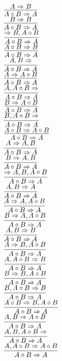 \documentclass[11pt]{article}
\begin{document}
\begin{center}
\bigskip
\\$\infer{A\circ B\Rightarrow A}{A\Rightarrow B}$
\bigskip
\\$\infer{A\circ B\Rightarrow A}{B\Rightarrow B}$
\bigskip
\\$\infer{A\circ B\Rightarrow A}{\Rightarrow B, A\circ B}$
\bigskip
\\$\infer{A\circ B\Rightarrow A}{A\circ B\Rightarrow B}$
\bigskip
\\$\infer{A\circ B\Rightarrow A}{A, B\Rightarrow }$
\bigskip
\\$\infer{A\circ B\Rightarrow A}{A\Rightarrow A\circ B}$
\bigskip
\\$\infer{A\circ B\Rightarrow A}{A, A\circ B\Rightarrow }$
\bigskip
\\$\infer{A\circ B\Rightarrow A}{B\Rightarrow A\circ B}$
\bigskip
\\$\infer{A\circ B\Rightarrow A}{B, A\circ B\Rightarrow }$
\bigskip
\\$\infer{A\circ B\Rightarrow A}{A\circ B\Rightarrow A\circ B}$
\bigskip
\\$\infer{A\circ B\Rightarrow A}{A\Rightarrow A, B}$
\bigskip
\\$\infer{A\circ B\Rightarrow A}{B\Rightarrow A, B}$
\bigskip
\\$\infer{A\circ B\Rightarrow A}{\Rightarrow A, B, A\circ B}$
\bigskip
\\$\infer{A\circ B\Rightarrow A}{A, B\Rightarrow A}$
\bigskip
\\$\infer{A\circ B\Rightarrow A}{A\Rightarrow A, A\circ B}$
\bigskip
\\$\infer{A\circ B\Rightarrow A}{B\Rightarrow A, A\circ B}$
\bigskip
\\$\infer{A\circ B\Rightarrow A}{A, B\Rightarrow B}$
\bigskip
\\$\infer{A\circ B\Rightarrow A}{A\Rightarrow B, A\circ B}$
\bigskip
\\$\infer{A\circ B\Rightarrow A}{A, A\circ B\Rightarrow B}$
\bigskip
\\$\infer{A\circ B\Rightarrow A}{B\Rightarrow B, A\circ B}$
\bigskip
\\$\infer{A\circ B\Rightarrow A}{B, A\circ B\Rightarrow B}$
\bigskip
\\$\infer{A\circ B\Rightarrow A}{A\circ B\Rightarrow B, A\circ B}$
\bigskip
\\$\infer{A\circ B\Rightarrow A}{A, B\Rightarrow A\circ B}$
\bigskip
\\$\infer{A\circ B\Rightarrow A}{A, B, A\circ B\Rightarrow }$
\bigskip
\\$\infer{A\circ B\Rightarrow A}{A, A\circ B\Rightarrow A\circ B}$

\end{center}
\end{document}
